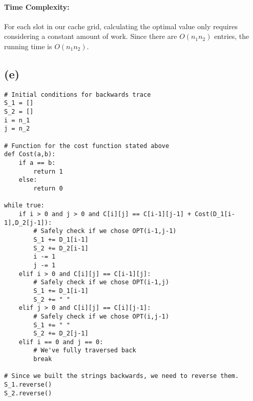 \paragraph{Time Complexity:}
For each slot in our cache grid, calculating the optimal value only requires considering a constant amount of work. Since there are $O(n_1n_2)$ entries, the running time is $O(n_1n_2)$.

\subsection*{(e)}

\begin{verbatim}
# Initial conditions for backwards trace
S_1 = []
S_2 = []
i = n_1
j = n_2

# Function for the cost function stated above
def Cost(a,b):
    if a == b:
        return 1
    else:
        return 0

while true:
    if i > 0 and j > 0 and C[i][j] == C[i-1][j-1] + Cost(D_1[i-1],D_2[j-1]):
        # Safely check if we chose OPT(i-1,j-1)
        S_1 += D_1[i-1]
        S_2 += D_2[i-1]
        i -= 1
        j -= 1
    elif i > 0 and C[i][j] == C[i-1][j]:
        # Safely check if we chose OPT(i-1,j)
        S_1 += D_1[i-1]
        S_2 += " "
    elif j > 0 and C[i][j] == C[i][j-1]:
        # Safely check if we chose OPT(i,j-1)
        S_1 += " "
        S_2 += D_2[j-1]
    elif i == 0 and j == 0:
        # We've fully traversed back
        break

# Since we built the strings backwards, we need to reverse them.
S_1.reverse()
S_2.reverse()
\end{verbatim}